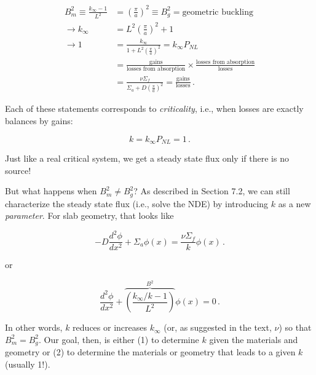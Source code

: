 \documentclass[compact]{ne630handout}
\begin{document}
\begin{handoutflow}

\[
\begin{split}
  B_m^2 \equiv \frac{k_{\infty}-1}{L^2} &= \left ( \frac{\pi}{a} \right )^2 \equiv B_g^2 = \text{geometric buckling}\\
 \rightarrow k_{\infty} &= L^2 \left ( \frac{\pi}{a} \right )^2 + 1 \\
 \rightarrow 1          &= \frac{k_{\infty}}{ 1 + L^2 \left ( \frac{\pi}{a} \right )^2  } = k_{\infty} P_{NL} \\ & = \frac{\text{gains}}{\text{losses from absorption}} \times \frac{\text{losses from absorption}}{\text{losses}} \\
           &= \frac{ \nu\Sigma_f }{ \Sigma_a + D \left ( \frac{\pi}{a} \right )^2  } = \frac{\text{gains}}{\text{losses}} \, .
\end{split}
\]

Each of these statements corresponds to \emph{criticality}, i.e., when losses are exactly balances by gains:

\[
   {\boxed{k = k_{\infty} P_{NL} =   1}} \, .
\]

Just like a real critical system, we get a steady state flux only if there is no source!

But what happens when \(B_m^2 \neq B_g^2\)? As described in Section 7.2, we can still characterize the steady state flux (i.e., solve the NDE) by introducing \(k\) as a new \emph{parameter}. For slab geometry, that looks like

\[
  -D \frac{d^2\phi}{dx^2} + \Sigma_a \phi(x) = \frac{\nu\Sigma_f}{k} \phi(x) \, .
\]

or

\[
 \frac{d^2\phi}{dx^2} + \overbrace{\left ( \frac{k_{\infty}/k-1}{L^2} \right )}^{B^2} \phi(x)  = 0\, .
 \tag{Lewis (7.4), but for slabs}
\]

In other words, \(k\) reduces or increases \(k_{\infty}\) (or, as suggested in the text, \(\nu\)) so that \(B_m^2 = B_g^2\). Our goal, then, is either (1) to determine \(k\) given the materials and geometry or (2) to determine the materials or geometry that leads to a given \(k\) (usually 1!).


\end{handoutflow}
\end{document}
